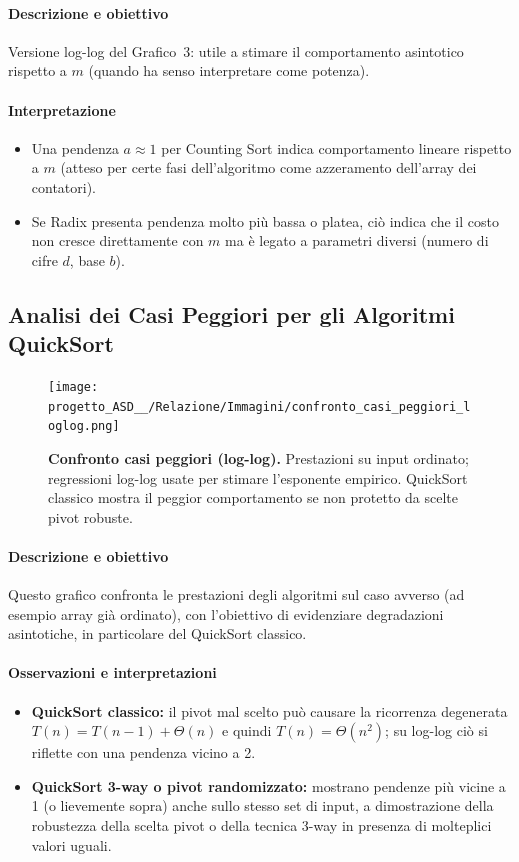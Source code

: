 \documentclass[a4paper, 11pt]{article}
\begin{document}
\paragraph{Descrizione e obiettivo}
Versione log-log del Grafico~3: utile a stimare il comportamento asintotico rispetto a \(m\) (quando ha senso interpretare come potenza).

\paragraph{Interpretazione}
\begin{itemize}
  \item Una pendenza \(a\approx 1\) per Counting Sort indica comportamento lineare rispetto a \(m\) (atteso per certe fasi dell'algoritmo come azzeramento dell'array dei contatori).
  \item Se Radix presenta pendenza molto più bassa o platea, ciò indica che il costo non cresce direttamente con \(m\) ma è legato a parametri diversi (numero di cifre \(d\), base \(b\)).
\end{itemize}

\subsection{Analisi dei Casi Peggiori per gli Algoritmi QuickSort}
\begin{figure}[H]
\centering
\texttt{[image: progetto\_ASD\_\_/Relazione/Immagini/confronto\_casi\_peggiori\_loglog.png]}
\caption{\textbf{Confronto casi peggiori (log-log).} Prestazioni su input ordinato; regressioni log-log usate per stimare l'esponente empirico. QuickSort classico mostra il peggior comportamento se non protetto da scelte pivot robuste.}
\label{fig:variazione_m}
\end{figure}

\paragraph{Descrizione e obiettivo}
Questo grafico confronta le prestazioni degli algoritmi sul caso avverso (ad esempio array già ordinato), con l'obiettivo di evidenziare degradazioni asintotiche, in particolare del QuickSort classico.

\paragraph{Osservazioni e interpretazioni}
\begin{itemize}
  \item \textbf{QuickSort classico:} il pivot mal scelto può causare la ricorrenza degenerata \(T(n)=T(n-1)+\Theta(n)\) e quindi \(T(n)=\Theta(n^2)\); su log-log ciò si riflette con una pendenza vicino a 2.
  \item \textbf{QuickSort 3-way o pivot randomizzato:} mostrano pendenze più vicine a 1 (o lievemente sopra) anche sullo stesso set di input, a dimostrazione della robustezza della scelta pivot o della tecnica 3-way in presenza di molteplici valori uguali.
\end{itemize}
\end{document}
